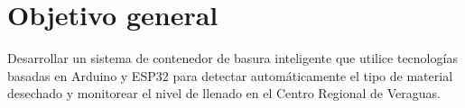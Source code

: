 \section{Objetivo general}
Desarrollar un sistema de contenedor de basura inteligente que utilice tecnologías basadas en Arduino y ESP32 para detectar automáticamente el tipo de material desechado y monitorear el nivel de llenado en el Centro Regional de Veraguas.